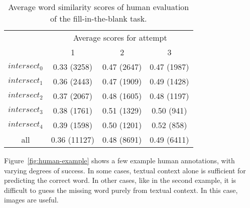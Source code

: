 \documentclass[twocolumn]{svjour3}          \smartqed  \usepackage{graphicx}
\begin{document}
\begin{table}[t]
    \centering
    \caption{Average word similarity scores of human evaluation of the fill-in-the-blank task.}
    \label{tbl:stats_humanevalscore}
\begin{tabular}{cccc}
        \toprule
        & \multicolumn{3}{c}{Average scores for attempt} \\
        \cline{2-4}
        & 1 & 2 & 3 \\
        \midrule
        $intersect_0$ & 0.33 (3258) & 0.47 (2647) & 0.47 (1987) \\
        $intersect_1$ & 0.36 (2443) & 0.47 (1909) & 0.49 (1428) \\
        $intersect_2$ & 0.37 (2067) & 0.48 (1605) & 0.48 (1197) \\
        $intersect_3$ & 0.38 (1761) & 0.51 (1329) & 0.50 (941) \\
        $intersect_4$ & 0.39 (1598) & 0.50 (1201) & 0.52 (858) \\
        \midrule
        all & 0.36 (11127) & 0.48 (8691) & 0.49 (6411) \\
        \bottomrule
    \end{tabular}
\end{table}

Figure~\ref{fig:human-example} shows a few example human annotations, with varying degrees of success. In some cases, textual context alone is sufficient for predicting the correct word. In other cases, like in the second example, it is difficult to guess the missing word purely from textual context. In this case, images are useful.
\end{document}

